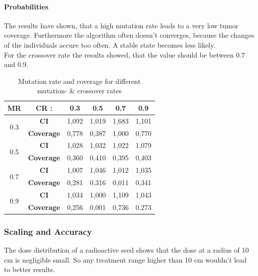 \documentclass[12pt]{article}
\begin{document}
\newpage
\paragraph{Probabilities} 
The results have shown, that a high mutation rate leads to a very low tumor coverage. Furthermore the algorithm often doesn't converges, because the changes of the individuals accure too often. A stable state becomes less likely. \\ For the crossover rate the results showed, that the value should be between 0.7 and 0.9.
\begin{table}[h]
\label{table:probabilities}
\begin{tabular}{c|ccccc}
\textbf{MR}          & \textbf{CR :}     & 0.3   & 0.5   & 0.7   & 0.9   \\ \hline
\multirow{2}{*}{0.3} & \textbf{CI}       & 1,092 & 1,019 & 1,683 & 1,101 \\
                     & \textbf{Coverage} & 0,778 & 0,387 & 1,000 & 0,770 \\ \hline
\multirow{2}{*}{0.5} & \textbf{CI}       & 1,028 & 1,032 & 1,022 & 1,079 \\
                     & \textbf{Coverage} & 0,360 & 0,410 & 0,395 & 0,403 \\ \hline
\multirow{2}{*}{0.7} & \textbf{CI}       & 1,007 & 1,046 & 1,012 & 1,035 \\
                     & \textbf{Coverage} & 0,281 & 0,316 & 0,011 & 0,341 \\ \hline
\multirow{2}{*}{0.9} & \textbf{CI}       & 1,034 & 1,000 & 1,109 & 1,043 \\
                     & \textbf{Coverage} & 0,256 & 0,001 & 0,736 & 0,273 \\
\end{tabular}
\caption{Mutation rate and coverage for different mutation-  \& crossover rates}

\end{table}
\subsubsection{Scaling and Accuracy}
The dose distribution of a radioactive seed shows that the dose at a radius of 10 cm is negligible small. So any treatment range higher than 10 cm wouldn't lead to better results. 





\end{document}
